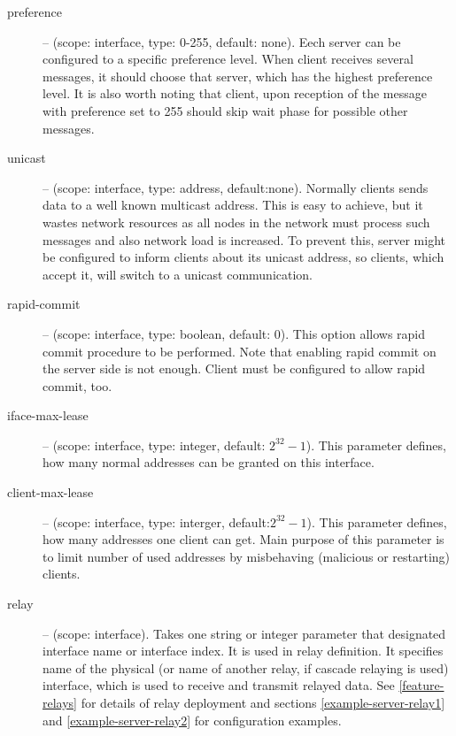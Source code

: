 \begin{description}
 \item[preference] -- (scope: interface, type: 0-255, default:
            none). Eech server can be configured to a specific
            preference level. When client receives several
             messages, it should choose that server,
            which has the highest preference level. It is also worth
            noting that client, upon reception of the 
            message with preference set to 255 should skip wait phase
            for possible other  messages.


 \item[unicast] -- (scope: interface, type: address,
            default:none). Normally clients sends data to a well known
            multicast address. This is easy to achieve, but it wastes
            network resources as all nodes in the network must process
            such messages and also network load is increased. To prevent
            this, server might be configured to inform clients about its
            unicast address, so clients, which accept it, will switch to
            a unicast communication.

 \item[rapid-commit] -- (scope: interface, type: boolean, default:
            0). This option allows rapid commit procedure to be
            performed. Note that enabling rapid commit on the server
            side is not enough. Client must be configured to allow
            rapid commit, too.

\item[iface-max-lease] -- (scope: interface, type: integer, default:
            $2^{32}-1$). This parameter defines, how many normal
            addresses can be granted on this interface.

\item[client-max-lease] -- (scope: interface, type: interger,
            default:$2^{32}-1$). This parameter defines, how many
            addresses one client can get. Main purpose of this
            parameter is to limit number of used addresses by
            misbehaving (malicious or restarting) clients.

\item[relay] -- (scope: interface). Takes one string or integer
  parameter that designated interface name or interface index. It is
  used in relay definition.  It specifies name of the physical (or
  name of another relay, if cascade relaying is used) interface, which
  is used to receive and transmit relayed data. See
  \ref{feature-relays} for details of relay deployment and sections
  \ref{example-server-relay1} and \ref{example-server-relay2} for
  configuration examples.


\end{description}
